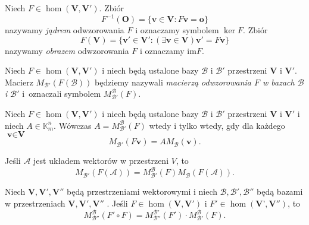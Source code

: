 	\begin{df}
		Niech $F \in \hom(\textbf{V},\textbf{V}')$. Zbiór
		\begin{equation*}
			F^{-1}(\textbf{O}) = \{ \textbf{v} \in \textbf{V} : F\textbf{v} = \textbf{o} \}
		\end{equation*}
		nazywamy \textit{jądrem} odwzorowania $F$ i oznaczamy symbolem $\ker F$. Zbiór 
		\begin{equation*}
			F(\textbf{V}) = \{ \textbf{v}' \in \textbf{V}' : (\exists \textbf{v} \in \textbf{V}) \textbf{v}' = F\textbf{v} \}
		\end{equation*}
		nazywamy \textit{obrazem} odwzorowania $F$ i oznaczamy $\text{im} F$. 
	\end{df}
	
	\begin{df}
		Niech $F \in \hom(\textbf{V}, \textbf{V}')$ i niech będą ustalone bazy $\mathcal{B}$ i $\mathcal{B}'$ przestrzeni $\textbf{V}$ i $\textbf{V}'$. Macierz $M_{\mathcal{B}'}(F(\mathcal{B}))$ będziemy nazywali \textit{macierzą odwzorowania $F$ w bazach $\mathcal{B}$ i $\mathcal{B}'$} i~oznaczali symbolem $M_{\mathcal{B}'}^{\mathcal{B}}(F)$.
	\end{df}
	
	\begin{tw}
			Niech $F \in \hom(\textbf{V}, \textbf{V}')$ i niech będą ustalone bazy $\mathcal{B}$ i $\mathcal{B}'$ przestrzeni $\textbf{V}$ i $\textbf{V}'$ i niech $A \in \mathbb{K}_m^n$. Wówczas $A = M_{\mathcal{B}'}^{\mathcal{B}}(F)$ wtedy i tylko wtedy, gdy dla każdego $\textbf{v} \in \textbf{V}$
			\begin{equation}
				M_{\mathcal{B}'}(F\textbf{v}) = A M_{\mathcal{B}}(\textbf{v}).
			\end{equation}
	\end{tw}
	
	\begin{wnsk}
		Jeśli $\mathcal{A}$ jest układem wektorów w przestrzeni $V$, to 
		\begin{equation*}
				M_{\mathcal{B}'}(F(\mathcal{A})) = M_{\mathcal{B}'}^{\mathcal{B}}(F) M_{\mathcal{B}}(F(\mathcal{A})).
		\end{equation*}
	\end{wnsk}
	
	\begin{tw}
		Niech $\textbf{V}, \textbf{V}', \textbf{V}''$ będą przestrzeniami wektorowymi i niech $\mathcal{B}, \mathcal{B}', \mathcal{B}''$ będą bazami w przestrzeniach  $\textbf{V}, \textbf{V}', \textbf{V}''$ . Jeśli $F \in \hom(\textbf{V}, \textbf{V}')$ i $F' \in \hom(\textbf{V'}, \textbf{V}'')$, to
		\begin{equation*}
			 M_{\mathcal{B}''}^{\mathcal{B}}(F' \circ F) =  M_{\mathcal{B}''}^{\mathcal{B}'}(F') \cdot M_{\mathcal{B}'}^{\mathcal{B}}(F).
		\end{equation*}
	\end{tw}